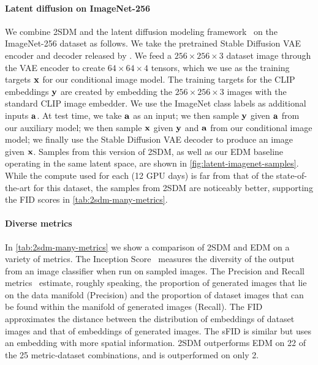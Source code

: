 \paragraph{Latent diffusion on ImageNet-256}
We combine 2SDM and the latent diffusion modeling framework~\citep{rombach2022high} on the ImageNet-256 dataset as follows. We take the pretrained Stable Diffusion VAE encoder and decoder released by \citet{rombach2022high}. We feed a $256\times256\times3$ dataset image through the VAE encoder to create $64\times64\times4$ tensors, which we use as the training targets ${\mathbf{x}}$ for our conditional image model. The training targets for the CLIP embeddings ${\mathbf{y}}$ are created by embedding the $256\times256\times3$ images with the standard CLIP image embedder. We use the ImageNet class labels as additional inputs ${\mathbf{a}}$. At test time, we take ${\mathbf{a}}$ as an input; we then sample ${\mathbf{y}}$ given ${\mathbf{a}}$ from our auxiliary model; we then sample ${\mathbf{x}}$ given ${\mathbf{y}}$ and ${\mathbf{a}}$ from our conditional image model; we finally use the Stable Diffusion VAE decoder to produce an image given ${\mathbf{x}}$. Samples from this version of 2SDM, as well as our EDM baseline operating in the same latent space, are shown in \cref{fig:latent-imagenet-samples}. While the compute used for each (12 GPU days) is far from that of the state-of-the-art for this dataset, the samples from 2SDM are noticeably better, supporting the FID scores in \cref{tab:2sdm-many-metrics}.

\paragraph{Diverse metrics}
In \cref{tab:2sdm-many-metrics} we show a comparison of 2SDM and EDM on a variety of metrics. The Inception Score~\citep{salimans2016improved,barratt2018note} measures the diversity of the output from an image classifier when run on sampled images. The Precision and Recall metrics~\citep{kynkaanniemi2019improved} estimate, roughly speaking, the proportion of generated images that lie on the data manifold (Precision) and the proportion of dataset images that can be found within the manifold of generated images (Recall). The FID approximates the distance between the distribution of embeddings of dataset images and that of embeddings of generated images. The sFID is similar but uses an embedding with more spatial information. 2SDM outperforms EDM on 22 of the 25 metric-dataset combinations, and is outperformed on only 2.

